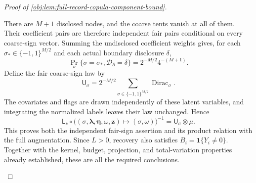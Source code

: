 \begin{proof}[Proof of \cref{obj:lem:full-record-copula-component-bound}]
\begin{enumerate}
There are \(M+1\) disclosed nodes, and the coarse tents vanish at all of them. Their coefficient pairs are therefore independent fair pairs conditional on every coarse-sign vector. Summing the undisclosed coefficient weights gives, for each
\(\sigma_*\in\{-1,1\}^{M/2}\) and each actual boundary disclosure \(\delta\),
\[
\Pr_\nu\{\sigma=\sigma_*,\mathcal D_{\partial}=\delta\}
 =2^{-M/2}4^{-(M+1)}.
\]
Define the fair coarse-sign law by
\[
\mathsf U_\sigma
 =2^{-M/2}\sum_{\sigma\in\{-1,1\}^{M/2}}
       \operatorname{Dirac}_{\sigma}.
\]
The covariates and flags are drawn independently of these latent variables, and integrating the normalized labels leaves their law unchanged. Hence
\[
\mathsf L_\nu\circ
 \bigl((\sigma,\boldsymbol\lambda,\boldsymbol\eta,\omega,\mathbf z)
       \mapsto(\sigma,\omega)\bigr)^{-1}
 =\mathsf U_\sigma\otimes\mu.
\]
This proves both the independent fair-sign assertion and its product relation with the full augmentation. Since \(L>0\), recovery also satisfies
\(B_i=\mathbf1\{Y_i\ne0\}\). Together with the kernel, budget, projection, and total-variation properties already established, these are all the required conclusions.
\end{enumerate}
\end{proof}
